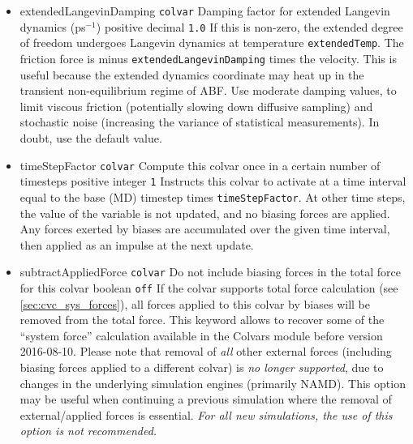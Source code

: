 \begin{itemize}
\item %
  \keydef
    {extendedLangevinDamping}{%
    \texttt{colvar}}{%
    Damping factor for extended Langevin dynamics
    (ps$^{-1}$)}{%
    positive decimal}{%
    \texttt{1.0}}{%
    If this is non-zero, the extended degree of freedom undergoes Langevin dynamics
    at temperature \texttt{extendedTemp}. The friction force is minus
    \texttt{extendedLangevinDamping} times the velocity. This is useful because
    the extended dynamics coordinate may heat up in the transient
    non-equilibrium regime of ABF. Use moderate damping values, to limit
    viscous friction (potentially slowing down diffusive sampling) and stochastic
    noise (increasing the variance of statistical measurements). In
    doubt, use the default value.}
\end{itemize}



\begin{itemize}

  \item %
    \keydef
      {timeStepFactor}{%
      \texttt{colvar}}{%
      Compute this colvar once in a certain number of timesteps}{%
      positive integer}{%
      \texttt{1}}{%
      Instructs this colvar to activate at a time interval equal to the base (MD)
      timestep times \texttt{timeStepFactor}.\cite{Ferrarotti2015}
      At other time steps, the value of the
      variable is not updated, and no biasing forces are applied.
      Any forces exerted by biases are accumulated over the given time interval,
      then applied as an impulse at the next update.
      }
\end{itemize}


\begin{itemize}

\item %
  \keydef
    {subtractAppliedForce}{%
    \texttt{colvar}}{%
    Do not include biasing forces in the total force for this colvar}{%
    boolean}{%
    \texttt{off}}{%
    If the colvar supports total force calculation (see \ref{sec:cvc_sys_forces}), all forces applied to this colvar by biases will be removed from the total force.
    This keyword allows to recover some of the ``system force'' calculation available in the Colvars module     before version 2016-08-10.
    Please note that removal of \emph{all} other external forces (including biasing forces applied to a         different colvar) is \emph{no longer supported}, due to changes in the underlying simulation engines (primarily NAMD).
    This option may be useful when continuing a previous simulation where the removal of external/applied forces is essential.
    \emph{For all new simulations, the use of this option is not recommended.}
}

\end{itemize}


